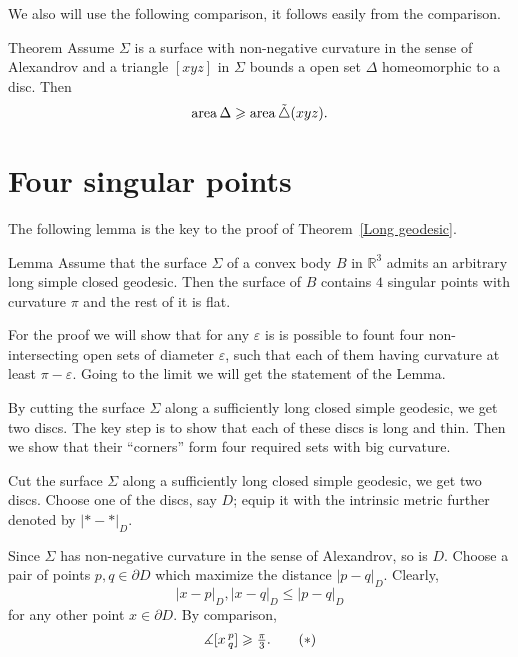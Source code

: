 \documentclass[oneside,a4paper, 12pt]{article}
\begin{document}

We also will use the following comparison,
it follows easily from the comparison.

\begin{thm}{Theorem}
Assume $\Sigma$ is a surface with non-negative curvature in the sense of Alexandrov
and a triangle $[xyz]$ in $\Sigma$ bounds a open set $\Delta$ homeomorphic to a disc.
Then 
\[\mathop{\rm area}\nolimits\Delta\geqslant \mathop{\rm area}\nolimits\tilde\triangle(xyz).\]

\end{thm}

\section{Four singular points}

The following lemma is the key to the proof of Theorem~\ref{Long geodesic}.

\begin{thm}{Lemma} 
Assume that the surface $\Sigma$ of a convex body $B$ in $\mathbb{R}^3$
admits an arbitrary long simple closed geodesic.
Then the surface of $B$ contains $4$ singular points with curvature $\pi$ and the rest of it is flat.
\end{thm}

For the proof we will show that for any $\varepsilon$ is is possible to fount four non-intersecting open sets of diameter $\varepsilon$, such that each of them having curvature at least $\pi - \varepsilon$.
Going to the limit we will get the statement of the Lemma.

By cutting the surface $\Sigma$ along a sufficiently long closed simple geodesic,
we get two discs.
The key step is to show that each of these discs is long and thin.
Then we show that their ``corners'' form four required sets with big curvature.

Cut the surface $\Sigma$ along a sufficiently long closed simple geodesic,
we get two discs.
Choose one of the discs, say $D$;
equip it with the intrinsic metric further denoted by $|{*}-{*}|_D$.


Since $\Sigma$ has non-negative curvature in the sense of Alexandrov,
so is $D$.
Choose a pair of points $p,q\in\partial D$ which maximize the distance $|p-q|_D$.
Clearly,
\[|x-p|_D,|x-q|_D\le |p-q|_D\] 
for any other point $x\in\partial D$.
By comparison, 
\begin{equation}
	\label{eq:pxq>pi/3}
	\measuredangle[x\,^p_q]\ge \tfrac\pi3.\tag{${*}$}
\end{equation}
\end{document}
